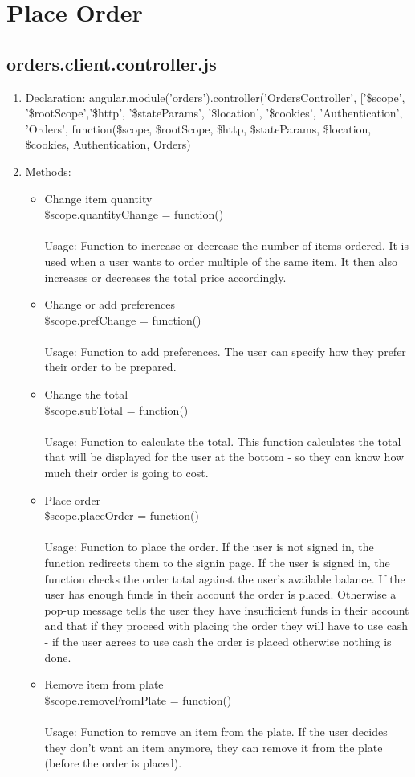 \documentclass[a4paper,12pt]{article}
\begin{document}
\section{Place Order}
\subsection{orders.client.controller.js}
\begin{enumerate}
\item Declaration: angular.module('orders').controller('OrdersController', ['\$scope', '\$rootScope','\$http', '\$stateParams', '\$location', '\$cookies', 'Authentication', 'Orders',
function(\$scope, \$rootScope, \$http, \$stateParams, \$location, \$cookies, Authentication, Orders)  
\item Methods:
\begin{itemize}
\item Change item quantity \\ \$scope.quantityChange = function() 
\\ \\ Usage: Function to increase or decrease the number of items ordered. It is used when a user wants to order multiple of the same item. It then also increases or decreases the total price accordingly.
\item Change or add preferences \\ \$scope.prefChange = function() 
\\ \\ Usage: Function to add preferences. The user can specify how they prefer their order to be prepared.
\item Change the total \\ \$scope.subTotal = function() 
\\ \\ Usage: Function to calculate the total. This function calculates the total that will be displayed for the user at the bottom - so they can know how much their order is going to cost.
\item Place order \\ \$scope.placeOrder = function()
\\ \\ Usage: Function to place the order. If the user is not signed in, the function redirects them to the signin page. If the user is signed in, the function checks the order total against the user's available balance. If the user has enough funds in their account the order is placed. Otherwise a pop-up message tells the user they have insufficient funds in their account and that if they proceed with placing the order they will have to use cash - if the user agrees to use cash the order is placed otherwise nothing is done.
\item Remove item from plate \\ \$scope.removeFromPlate = function()
\\ \\ Usage: Function to remove an item from the plate. If the user decides they don't want an item anymore, they can remove it from the plate (before the order is placed).
\end{itemize}
\end{enumerate}
\end{document}

